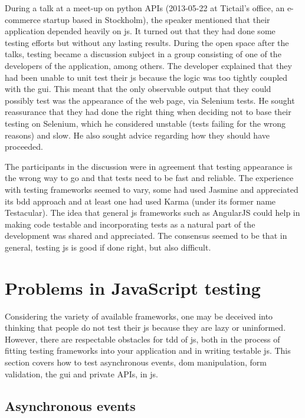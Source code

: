 \documentclass[11pt]{article}
\begin{document}
During a talk at a meet-up on python APIs (2013-05-22 at Tictail's office, an e-commerce startup based in Stockholm), the speaker mentioned that their application depended heavily on \gls{js}. It turned out that they had done some testing efforts but without any lasting results. During the open space after the talks, testing became a discussion subject in a group consisting of one of the developers of the application, among others. The developer explained that they had been unable to unit test their \gls{js} because the logic was too tightly coupled with the \gls{gui}. This meant that the only observable output that they could possibly test was the appearance of the web page, via Selenium tests. He sought reassurance that they had done the right thing when deciding not to base their testing on Selenium, which he considered unstable (tests failing for the wrong reasons) and slow. He also sought advice regarding how they should have proceeded.

The participants in the discussion were in agreement that testing appearance is the wrong way to go and that tests need to be fast and reliable. The experience with testing frameworks seemed to vary, some had used Jasmine and appreciated its \gls{bdd} approach and at least one had used Karma (under its former name Testacular). The idea that general \gls{js} frameworks such as AngularJS could help in making code testable and incorporating tests as a natural part of the development was shared and appreciated. The consensus seemed to be that in general, testing \gls{js} is good if done right, but also difficult.


\section{Problems in JavaScript testing}
\label{sec:jsproblems}

Considering the variety of available frameworks, one may be deceived into thinking that people do not test their \gls{js} because they are lazy or uninformed. However, there are respectable obstacles for \gls{tdd} of \gls{js}, both in the process of fitting testing frameworks into your application and in writing testable \gls{js}. This section covers how to test asynchronous events, \gls{dom} manipulation, form validation, the \gls{gui} and private APIs, in \gls{js}.

\subsection{Asynchronous events}
\label{subsec:asynchronous}
\end{document}
